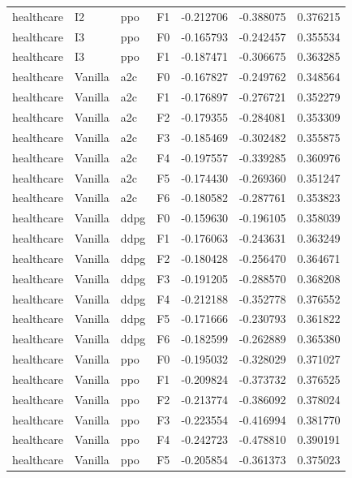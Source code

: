 \begin{tabular}{llllrrr}
healthcare &      I2 &       ppo &  F1 & -0.212706 & -0.388075 &  0.376215 \\
healthcare &      I3 &       ppo &  F0 & -0.165793 & -0.242457 &  0.355534 \\
healthcare &      I3 &       ppo &  F1 & -0.187471 & -0.306675 &  0.363285 \\
healthcare & Vanilla &       a2c &  F0 & -0.167827 & -0.249762 &  0.348564 \\
healthcare & Vanilla &       a2c &  F1 & -0.176897 & -0.276721 &  0.352279 \\
healthcare & Vanilla &       a2c &  F2 & -0.179355 & -0.284081 &  0.353309 \\
healthcare & Vanilla &       a2c &  F3 & -0.185469 & -0.302482 &  0.355875 \\
healthcare & Vanilla &       a2c &  F4 & -0.197557 & -0.339285 &  0.360976 \\
healthcare & Vanilla &       a2c &  F5 & -0.174430 & -0.269360 &  0.351247 \\
healthcare & Vanilla &       a2c &  F6 & -0.180582 & -0.287761 &  0.353823 \\
healthcare & Vanilla &      ddpg &  F0 & -0.159630 & -0.196105 &  0.358039 \\
healthcare & Vanilla &      ddpg &  F1 & -0.176063 & -0.243631 &  0.363249 \\
healthcare & Vanilla &      ddpg &  F2 & -0.180428 & -0.256470 &  0.364671 \\
healthcare & Vanilla &      ddpg &  F3 & -0.191205 & -0.288570 &  0.368208 \\
healthcare & Vanilla &      ddpg &  F4 & -0.212188 & -0.352778 &  0.376552 \\
healthcare & Vanilla &      ddpg &  F5 & -0.171666 & -0.230793 &  0.361822 \\
healthcare & Vanilla &      ddpg &  F6 & -0.182599 & -0.262889 &  0.365380 \\
healthcare & Vanilla &       ppo &  F0 & -0.195032 & -0.328029 &  0.371027 \\
healthcare & Vanilla &       ppo &  F1 & -0.209824 & -0.373732 &  0.376525 \\
healthcare & Vanilla &       ppo &  F2 & -0.213774 & -0.386092 &  0.378024 \\
healthcare & Vanilla &       ppo &  F3 & -0.223554 & -0.416994 &  0.381770 \\
healthcare & Vanilla &       ppo &  F4 & -0.242723 & -0.478810 &  0.390191 \\
healthcare & Vanilla &       ppo &  F5 & -0.205854 & -0.361373 &  0.375023 \\

\end{tabular}
